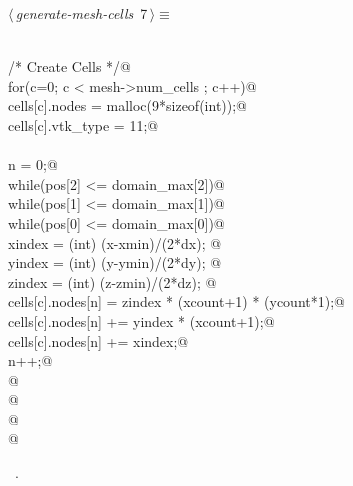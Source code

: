 \documentclass[a4paper,11pt]{article}
\begin{document}
\begin{flushleft}
\begin{minipage}{\linewidth}
\begin{list}{}{\setlength{\itemsep}{-\parsep}\setlength{\itemindent}{-\leftmargin}}
\item{}
\end{list}
\end{minipage}\vspace{4ex}
\end{flushleft}
\begin{flushleft} \small
\begin{minipage}{\linewidth}\label{scrap5}\raggedright\small
{} $\langle\,${\itshape generate-mesh-cells}\nobreak\ {\footnotesize {7}}$\,\rangle\equiv$
\vspace{-1ex}
\begin{list}{}{} \item
\mbox{}\verb@@\\
\mbox{}\verb@/* Create Cells */@\\
\mbox{}\verb@    for(c=0; c < mesh->num_cells ; c++){@\\
\mbox{}\verb@        cells[c].nodes = malloc(9*sizeof(int));@\\
\mbox{}\verb@        cells[c].vtk_type = 11;@\\
\mbox{}\verb@@\\
\mbox{}\verb@        n = 0;@\\
\mbox{}\verb@        while(pos[2] <= domain_max[2]){@\\
\mbox{}\verb@            while(pos[1] <= domain_max[1]){@\\
\mbox{}\verb@                while(pos[0] <= domain_max[0]){@\\
\mbox{}\verb@                    xindex = (int) (x-xmin)/(2*dx);  @\\
\mbox{}\verb@                    yindex = (int) (y-ymin)/(2*dy);  @\\
\mbox{}\verb@                    zindex = (int) (z-zmin)/(2*dz);  @\\
\mbox{}\verb@                    cells[c].nodes[n]  = zindex * (xcount+1) * (ycount*1);@\\
\mbox{}\verb@                    cells[c].nodes[n] += yindex * (xcount+1);@\\
\mbox{}\verb@                    cells[c].nodes[n] += xindex;@\\
\mbox{}\verb@                    n++;@\\
\mbox{}\verb@                }@\\
\mbox{}\verb@            }@\\
\mbox{}\verb@        }@\\
\mbox{}\verb@    }@\\
\mbox{}\verb@@{\NWsep}
\end{list}
\vspace{-1.5ex}
\footnotesize
\begin{list}{}{\setlength{\itemsep}{-\parsep}\setlength{\itemindent}{-\leftmargin}}
\item \NWtxtMacroRefIn\ .

\item{}
\end{list}
\end{minipage}\vspace{4ex}
\end{flushleft}
\end{document}
